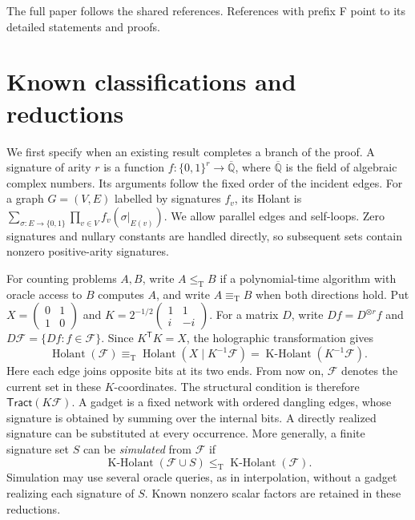\documentclass[11pt,letterpaper,onecolumn]{article}
\theoremstyle{plain}
\theoremstyle{definition}
\theoremstyle{remark}
\newcommand{\AlgNums}{\overline{\mathbb Q}}
\newcommand{\cF}{\mathcal F}
\newcommand{\Holant}{\operatorname{Holant}}
\newcommand{\KHolant}{\operatorname{K\text{-}Holant}}
\newcommand{\Tract}{\mathsf{Tract}}
\newcommand{\leT}{\leq_{\mathrm T}}
\newcommand{\equivT}{\equiv_{\mathrm T}}
\begin{document}
The full paper follows the shared references. References with prefix F
point to its detailed statements and proofs.

\section{Known classifications and reductions}
\label{short:sec:known}

We first specify when an existing result completes a branch of the proof.
A signature of arity \(r\) is a function
\(f:\{0,1\}^r\to\AlgNums\), where \(\AlgNums\) is the field of algebraic
complex numbers. Its arguments follow the fixed order of the incident
edges. For a graph \(G=(V,E)\) labelled by signatures \(f_v\), its Holant is
\(\sum_{\sigma:E\to\{0,1\}}\prod_{v\in V}f_v(\sigma|_{E(v)})\).
We allow parallel edges and self-loops. Zero signatures and nullary
constants are handled directly, so subsequent sets contain nonzero
positive-arity signatures.

For counting problems \(A,B\), write \(A\leT B\) if a polynomial-time
algorithm with oracle access to \(B\) computes \(A\), and write
\(A\equivT B\) when both directions hold.
Put \(X=\left(\begin{smallmatrix}0&1\\1&0\end{smallmatrix}\right)\) and
\(K=2^{-1/2}\left(\begin{smallmatrix}1&1\\i&-i\end{smallmatrix}\right)\).
For a matrix \(D\), write \(Df=D^{\otimes r}f\) and
\(D\cF=\{Df:f\in\cF\}\). Since \(K^{\mathsf T}K=X\), the holographic
transformation gives
\[
\Holant(\cF)\equivT\Holant(X\mid K^{-1}\cF)
=\KHolant(K^{-1}\cF).
\]
Here each edge joins opposite bits at its two ends. From now on, \(\cF\)
denotes the current set in these \(K\)-coordinates. The structural
condition is therefore \(\Tract(K\cF)\).
A gadget is a fixed network with ordered dangling edges, whose signature
is obtained by summing over the internal bits. A directly realized
signature can be substituted at every occurrence. More generally, a finite
signature set \(S\) can be \emph{simulated} from \(\cF\) if
\[
\KHolant(\cF\cup S)\leT\KHolant(\cF).
\]
Simulation may use several oracle queries, as in interpolation, without
a gadget realizing each signature of \(S\).
Known nonzero scalar factors are retained in these reductions.
\end{document}
